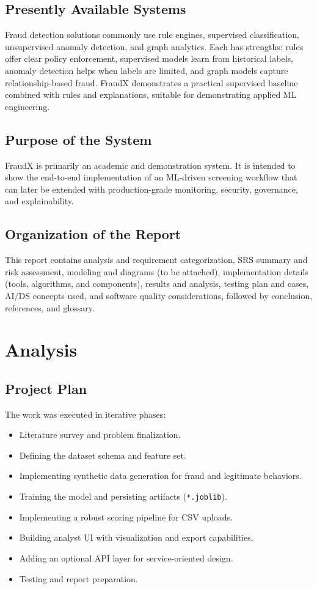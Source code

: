 \documentclass[12pt,a4paper]{report}
\begin{document}
\section{Presently Available Systems}
Fraud detection solutions commonly use rule engines, supervised classification, unsupervised anomaly detection, and graph analytics. Each has strengths: rules offer clear policy enforcement, supervised models learn from historical labels, anomaly detection helps when labels are limited, and graph models capture relationship-based fraud. FraudX demonstrates a practical supervised baseline combined with rules and explanations, suitable for demonstrating applied ML engineering.

\section{Purpose of the System}
FraudX is primarily an academic and demonstration system. It is intended to show the end-to-end implementation of an ML-driven screening workflow that can later be extended with production-grade monitoring, security, governance, and explainability.

\section{Organization of the Report}
This report contains analysis and requirement categorization, SRS summary and risk assessment, modeling and diagrams (to be attached), implementation details (tools, algorithms, and components), results and analysis, testing plan and cases, AI/DS concepts used, and software quality considerations, followed by conclusion, references, and glossary.

\chapter{Analysis}
\section{Project Plan}
The work was executed in iterative phases:
\begin{itemize}
  \item Literature survey and problem finalization.
  \item Defining the dataset schema and feature set.
  \item Implementing synthetic data generation for fraud and legitimate behaviors.
  \item Training the model and persisting artifacts (\texttt{*.joblib}).
  \item Implementing a robust scoring pipeline for CSV uploads.
  \item Building analyst UI with visualization and export capabilities.
  \item Adding an optional API layer for service-oriented design.
  \item Testing and report preparation.
\end{itemize}
\end{document}
